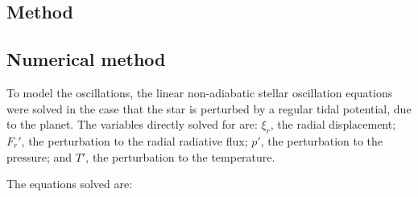 \documentclass[a0,portrait]{a0poster}
\begin{document}
\begin{multicols}{2}
\begin{tcolorbox}[colframe=black,colback=blue!10!white]
\vspace{0.5cm}

\section*{Method}


\subsection*{Numerical method}

To model the oscillations, the linear non-adiabatic stellar oscillation equations were solved in the case that the star is perturbed by a regular tidal potential, due to the planet. The variables directly solved for are: $\xi_{r}$, the radial displacement; $F_{r}'$, the perturbation to the radial radiative flux; $p'$, the perturbation to the pressure; and $T'$, the perturbation to the temperature.

The equations solved are:


\end{tcolorbox}
\end{multicols}
\end{document}
